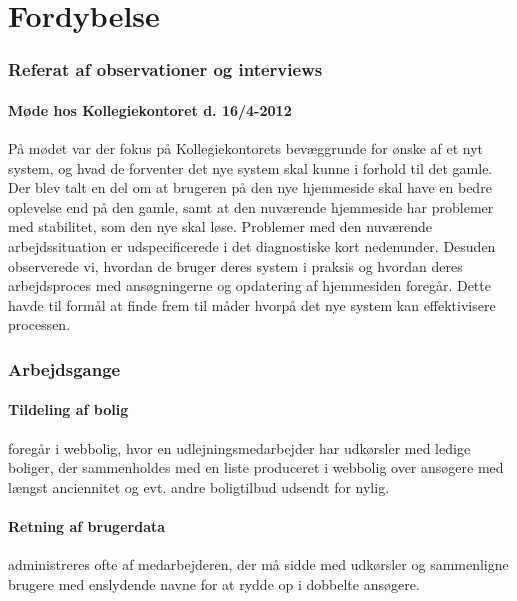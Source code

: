 \documentclass[12pt, a4paper]{report}
\begin{document}
\section{Fordybelse}
\subsubsection{Referat af observationer og interviews}
\paragraph{Møde hos Kollegiekontoret d. 16/4-2012}
På mødet var der fokus på Kollegiekontorets bevæggrunde for ønske af et nyt system, og hvad de forventer det nye system skal kunne i forhold til det gamle. Der blev talt en del om at brugeren på den nye hjemmeside skal have en bedre oplevelse end på den gamle, samt at den nuværende hjemmeside har problemer med stabilitet, som den nye skal løse. Problemer med den nuværende arbejdssituation er udspecificerede i det diagnostiske kort nedenunder.
Desuden observerede vi, hvordan de bruger deres system i praksis og hvordan deres arbejdsproces med ansøgningerne og opdatering af hjemmesiden foregår. Dette havde til formål at finde frem til måder hvorpå det nye system kan effektivisere processen.

\subsubsection{Arbejdsgange}
\paragraph{Tildeling af bolig} foregår i webbolig, hvor en udlejningsmedarbejder har udkørsler med ledige boliger, der sammenholdes med en liste produceret i webbolig over ansøgere med længst anciennitet og evt. andre boligtilbud udsendt for nylig.

\paragraph{Retning af brugerdata} administreres ofte af medarbejderen, der må sidde med udkørsler og sammenligne brugere med enslydende navne for at rydde op i dobbelte ansøgere.
\end{document}
